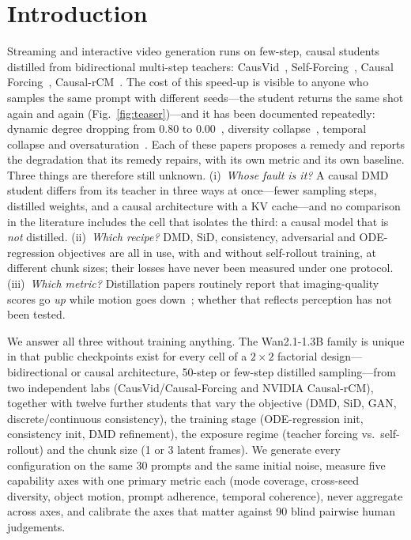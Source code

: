 \documentclass[10pt,twocolumn,letterpaper]{article}
\begin{document}
\section{Introduction}
Streaming and interactive video generation runs on few-step, causal students distilled from bidirectional multi-step teachers: CausVid~\cite{causvid}, Self-Forcing~\cite{selfforcing}, Causal Forcing~\cite{causalforcing}, Causal-rCM~\cite{causalrcm}. The cost of this speed-up is visible to anyone who samples the same prompt with different seeds---the student returns the same shot again and again (Fig.~\ref{fig:teaser})---and it has been documented repeatedly: dynamic degree dropping from $0.80$ to $0.00$~\cite{dynaforcing}, diversity collapse~\cite{uncertaintydmd,dataforcing}, temporal collapse and oversaturation~\cite{avd}. Each of these papers proposes a remedy and reports the degradation that its remedy repairs, with its own metric and its own baseline. Three things are therefore still unknown. (i)~\emph{Whose fault is it?} A causal DMD student differs from its teacher in three ways at once---fewer sampling steps, distilled weights, and a causal architecture with a KV cache---and no comparison in the literature includes the cell that isolates the third: a causal model that is \emph{not} distilled. (ii)~\emph{Which recipe?} DMD, SiD, consistency, adversarial and ODE-regression objectives are all in use, with and without self-rollout training, at different chunk sizes; their losses have never been measured under one protocol. (iii)~\emph{Which metric?} Distillation papers routinely report that imaging-quality scores go \emph{up} while motion goes down~\cite{dynaforcing}; whether that reflects perception has not been tested.

We answer all three without training anything. The Wan2.1-1.3B family is unique in that public checkpoints exist for every cell of a $2{\times}2$ factorial design---bidirectional or causal architecture, 50-step or few-step distilled sampling---from two independent labs (CausVid/Causal-Forcing and NVIDIA Causal-rCM), together with twelve further students that vary the objective (DMD, SiD, GAN, discrete/continuous consistency), the training stage (ODE-regression init, consistency init, DMD refinement), the exposure regime (teacher forcing vs.\ self-rollout) and the chunk size (1 or 3 latent frames). We generate every configuration on the same 30 prompts and the same initial noise, measure five capability axes with one primary metric each (mode coverage, cross-seed diversity, object motion, prompt adherence, temporal coherence), never aggregate across axes, and calibrate the axes that matter against 90 blind pairwise human judgements.
\end{document}
